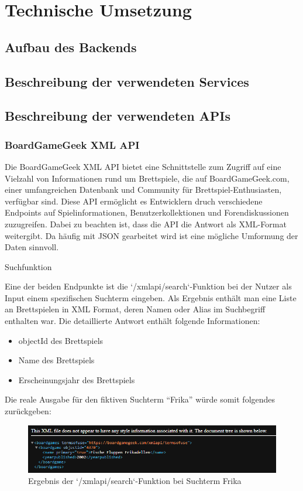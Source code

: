 \chapter{Technische Umsetzung}
\section{Aufbau des Backends}
\section{Beschreibung der verwendeten Services}


\section{Beschreibung der verwendeten APIs}
\subsection{BoardGameGeek XML API }

Die BoardGameGeek XML API bietet eine Schnittstelle zum Zugriff auf eine Vielzahl von Informationen rund um Brettspiele,
die auf BoardGameGeek.com, einer umfangreichen Datenbank und Community für Brettspiel-Enthusiasten,
verfügbar sind. Diese API ermöglicht es Entwicklern druch verschiedene Endpoints auf Spielinformationen,
Benutzerkollektionen und Forendiskussionen zuzugreifen. Dabei zu beachten ist, dass die API die Antwort als XML-Format weitergibt. 
Da häufig mit JSON gearbeitet wird ist eine mögliche Umformung der Daten sinnvoll.

\large Suchfunktion

Eine der beiden Endpunkte ist die `/xmlapi/search`-Funktion bei der Nutzer als Input einem spezifischen Suchterm eingeben.
Als Ergebnis enthält man eine Liste an Brettspielen in XML Format, deren Namen oder Alias im Suchbegriff enthalten war.
Die detaillierte Antwort enthält folgende Informationen:
\begin{itemize}
    \item {objectId des Brettspiels}
    \item {Name des Brettspiels}
    \item {Erscheinungsjahr des Brettspiels}
\end{itemize}

Die reale Ausgabe für den fiktiven Suchterm ``Frika'' würde somit folgendes zurückgeben: 
\begin{figure}[h]
    \centering
    \includegraphics[width=1\textwidth]{graphics/Search_API.png}
    \caption{Ergebnis der `/xmlapi/search`-Funktion bei Suchterm Frika}
    \label{fig:Search_API}
\end{figure}

